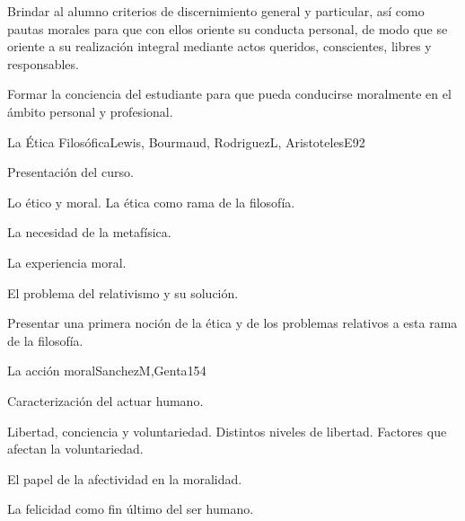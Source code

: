 \begin{syllabus}


\begin{justification}
Brindar al alumno criterios de discernimiento general y particular, así como pautas morales para que con ellos oriente su conducta personal, de modo que se oriente a su realización integral mediante actos queridos, conscientes, libres y responsables. 
\end{justification}

\begin{goals}
\item Formar la conciencia del estudiante para que pueda conducirse moralmente en el ámbito personal y profesional.
\end{goals}

\begin{outcomes}
\end{outcomes}

\begin{unit}{La Ética Filosófica}{Lewis, Bourmaud, RodriguezL, AristotelesE}{9}{2}
\begin{topics}
	\item	Presentación del curso. 
	\item	Lo ético y moral. La ética como rama de la filosofía.
	\item	La necesidad de la metafísica.
	\item	La experiencia moral.
	\item	El problema del relativismo y su solución.
	
\end{topics}
\begin{unitgoals}
	\item Presentar una primera noción de la ética y de los problemas relativos a esta rama de la filosofía.
\end{unitgoals}
\end{unit}

\begin{unit}{La acción moral}{SanchezM,Genta}{15}{4}
\begin{topics}
	\item	Caracterización del actuar humano. 
	\item	Libertad, conciencia y voluntariedad. Distintos niveles de libertad. Factores que afectan la voluntariedad.
	\item	El papel de la afectividad en la moralidad.
	\item	La felicidad como fin último del ser humano.


\end{topics}
\end{unit}
\end{syllabus}
